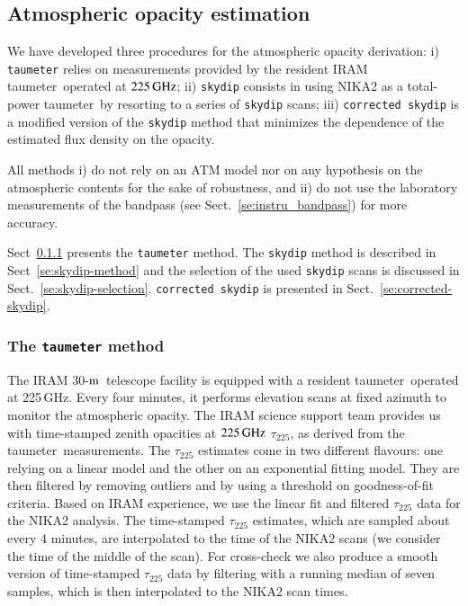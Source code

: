\documentclass[traditionalabstract]{aa}
\newcommand{\trentemetre}{30-$\rm{m}$}
\newcommand{\taumeter}{taumeter}
\begin{document}
\subsection{Atmospheric opacity estimation}
\label{se:opacity_methods}

We have developed three procedures for the atmospheric opacity
derivation: i) {\tt taumeter} relies on measurements
provided by the resident IRAM \taumeter\ operated at $225\,\rm{GHz}$;
ii) {\tt skydip} consists in using NIKA2 as a total-power \taumeter\ 
by resorting to a series of {\tt skydip} scans;
iii) {\tt corrected skydip} is a modified
version of the {\tt skydip} method that minimizes the dependence of the
estimated flux density on the opacity.

All methods i) do not rely on an ATM model nor on any
hypothesis on the atmospheric contents for the sake of robustness, and
ii) do not use the laboratory measurements of the bandpass (see 
Sect.~\ref{se:instru_bandpass}) for more accuracy.  

Sect~\ref{se:taumeter-method} presents the {\tt taumeter} method. The 
{\tt skydip} method is described in Sect~\ref{se:skydip-method} and
the selection of the used {\tt skydip} scans is discussed in
Sect.~\ref{se:skydip-selection}.
{\tt corrected skydip} is presented in Sect.~\ref{se:corrected-skydip}.

\subsubsection{The {\tt taumeter} method}
\label{se:taumeter-method}

The IRAM \trentemetre\ telescope facility is equipped with a
resident \taumeter\ operated at 225\,GHz. Every four
minutes, it performs elevation scans at fixed azimuth
to monitor the atmospheric opacity.
The IRAM science support
team provides us with time-stamped zenith opacities at $225\,\rm{GHz}$
$\tau_{225}$, as derived from the \taumeter\ measurements. The
$\tau_{225}$ estimates come in two different flavours: one relying
on a linear model and the other on an exponential fitting model. They
are then filtered by removing outliers and by using a threshold on
goodness-of-fit criteria.
Based on IRAM experience, we use the linear fit and filtered $\tau_{225}$
data for the NIKA2 analysis. The time-stamped $\tau_{225}$ estimates,
which are sampled about every 4 minutes, are interpolated to the time
of the NIKA2 scans (we consider the time of the middle of the
scan). For cross-check we also produce a smooth version of time-stamped
$\tau_{225}$ data by
filtering with a running median of seven samples, which is then
interpolated to the NIKA2 scan times.
\end{document}
